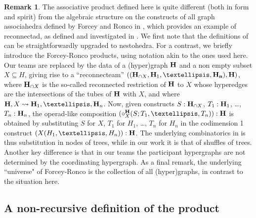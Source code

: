\documentclass[11pt]{article}
\theoremstyle{definition}
\newtheorem{remark}[theo]{Remark}
\numberwithin{equation}{section}
\numberwithin{equation}{section}
\newcommand{\inc}{\subseteq}
\newcommand{\hyper}[1]{{\bf #1}}
\begin{document}
\begin{remark} The associative product defined here is quite different (both in form and spirit) from the algebraic structure on the constructs of all graph associahedra  defined by Forcey and Ronco in \cite{FR}, which provides an example of reconnectad, as defined and investigated in \cite{DotsenkoReconnectad}.  We first note that the definitions of \cite{FR, DotsenkoReconnectad} can be straightforwardly upgraded to nestohedra.  For a contrast, we briefly introduce the Forcey-Ronco products, using notation akin to the ones used here. Our teams are replaced by the data of 
a (hyper)graph $\hyper{H}$ and a non empty subset $X\inc H$, giving rise to a ``reconnecteam'' 
$((\hyper{H}_{\cap X},\hyper{H}_1,\ldots,\hyper{H_n}),\hyper{H})$, where $\hyper{H}_{\cap X}$ is the so-called reconnected restriction of $\hyper{H}$ to $X$ whose hyperedges are the intersections of the tubes  of $\hyper{H}$ with $X$, and where $\hyper{H},X\leadsto \hyper{H}_1,\ldots, \hyper{H}_n$. Now, given constructs $S:\hyper{H}_{\cap X}$, $T_1:\hyper{H}_1$, \ldots, $T_n:\hyper{H}_n$, the operad-like composition $(\circ_X^{\hyper{H}}(S;T_1,\ldots,T_n)):\hyper{H}$  is obtained by substituting $S$ for $X$, $T_1$ for $H_1$, \ldots, $T_n$ for $H_n$ in the codimension 1 construct
$(X(H_1,\ldots,H_n)):\hyper{H}$. 
The underlying combinatorics in \cite{FR} is thus substitution in nodes of trees, while in our work it is that of  shuffles of trees. Another key difference is that in our teams the participant hypergraphs are not determined by the coordinating hypergraph. 
As a final remark, the underlying ``universe" of Forcey-Ronco is the collection of all (hyper)graphs, in contrast to the situation here.
\end{remark}


\subsection{A non-recursive definition of the product} \label{non-recursive}
\end{document}
